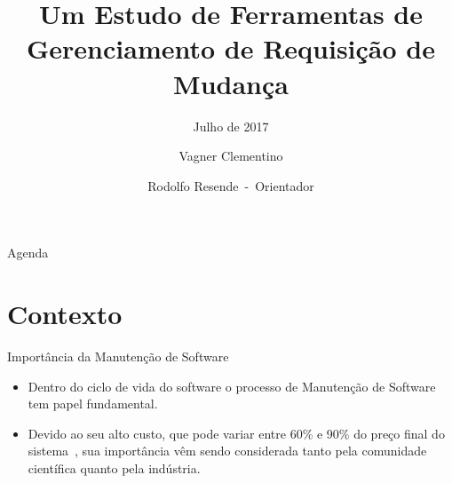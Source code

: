 \documentclass[t,14pt,mathserif]{beamer}
\title[] %
{Um Estudo de Ferramentas de \\
Gerenciamento de Requisição de Mudança}
\subtitle{Julho de 2017}
\author[] %
{Vagner Clementino\\%
	\and Rodolfo Resende~-~Orientador%
	}
\institute[] %
{Departamento de Ciência da Computação\\
 Universidade Federal de Minas Gerais
}
\date[2017/07/13] %
\begin{document}
\begin{frame}
  \titlepage{}
\end{frame}

\begin{frame}{Agenda}
  \tableofcontents[pausesections]
\end{frame}




\section{Contexto}

\begin{frame}{Importância da Manutenção de Software}
	\begin{itemize}
        \item Dentro do ciclo de vida do software o processo de Manutenção de
            Software tem papel fundamental.
        \item Devido ao seu alto custo, que pode variar entre 60\% e 90\% do
            preço final do sistema~\cite{kaur2015review}, sua importância vêm
            sendo considerada tanto pela comunidade científica quanto pela
            indústria.
	\end{itemize}
\end{frame}
\end{document}
